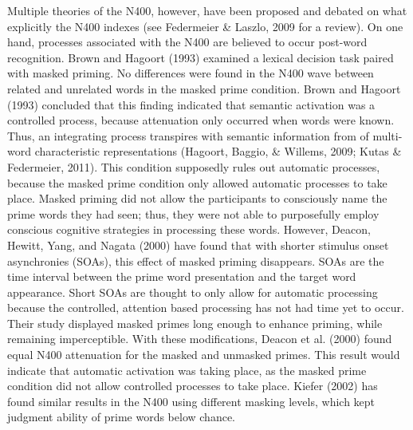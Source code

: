 \documentclass[english,man]{apa6}
\theoremstyle{definition}
\theoremstyle{definition}
\theoremstyle{remark}
\begin{document}
Multiple theories of the N400, however, have been proposed and debated
on what explicitly the N400 indexes (see Federmeier \& Laszlo, 2009 for
a review). On one hand, processes associated with the N400 are believed
to occur post-word recognition. Brown and Hagoort (1993) examined a
lexical decision task paired with masked priming. No differences were
found in the N400 wave between related and unrelated words in the masked
prime condition. Brown and Hagoort (1993) concluded that this finding
indicated that semantic activation was a controlled process, because
attenuation only occurred when words were known. Thus, an integrating
process transpires with semantic information from of multi-word
characteristic representations (Hagoort, Baggio, \& Willems, 2009; Kutas
\& Federmeier, 2011). This condition supposedly rules out automatic
processes, because the masked prime condition only allowed automatic
processes to take place. Masked priming did not allow the participants
to consciously name the prime words they had seen; thus, they were not
able to purposefully employ conscious cognitive strategies in processing
these words. However, Deacon, Hewitt, Yang, and Nagata (2000) have found
that with shorter stimulus onset asynchronies (SOAs), this effect of
masked priming disappears. SOAs are the time interval between the prime
word presentation and the target word appearance. Short SOAs are thought
to only allow for automatic processing because the controlled, attention
based processing has not had time yet to occur. Their study displayed
masked primes long enough to enhance priming, while remaining
imperceptible. With these modifications, Deacon et al. (2000) found
equal N400 attenuation for the masked and unmasked primes. This result
would indicate that automatic activation was taking place, as the masked
prime condition did not allow controlled processes to take place. Kiefer
(2002) has found similar results in the N400 using different masking
levels, which kept judgment ability of prime words below chance.
\end{document}
